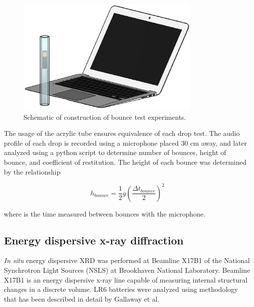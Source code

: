 \begin{figure}[htb]
  \centering
    \includegraphics[width=0.8\textwidth]{ch3-dbb/Images/Setup.eps}
    \caption[Schematic of bounce test experiments.]{Schematic of construction of bounce test experiments.}
    \label{fig:expschem}
\end{figure}

The usage of the acrylic tube ensures equivalence of each drop test. The audio profile of each drop is recorded using a microphone placed 30 cm away, and later analyzed using a python script to determine number of bounces, height of bounce, and coefficient of restitution. The height of each bounce was determined by the relationship

\begin{equation}
h_{bounce}= \frac{1}{2}g(\frac{\Delta t_{bounce}}{2})^2
\label{eq:bounce}
\end{equation}

\noindent where {} is the time measured between bounces with the microphone.

\subsection{Energy dispersive x-ray diffraction}

\textit{In situ} energy dispersive XRD was performed at Beamline X17B1 of the National Synchrotron Light Sources (NSLS) at Brookhaven National Laboratory.  Beamline X17B1 is an energy dispersive x-ray line capable of measuring internal structural changes in a discrete volume. LR6 batteries were analyzed using methodology that has been described in detail by Gallaway et al.~\cite{gallaway}